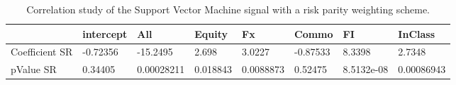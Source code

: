 \begin{table}[H]
\centering
\begin{tabular}{llllllll}
& intercept & All & Equity & Fx & Commo & FI & InClass \\ 
\hline 
Coefficient SR & -0.72356 & -15.2495 & 2.698 & 3.0227 & -0.87533 & 8.3398 & 2.7348 \\ 
pValue SR & 0.34405 & 0.00028211 & 0.018843 & 0.0088873 & 0.52475 & 8.5132e-08 & 0.00086943 \\ 
\hline
\end{tabular}
\caption{Correlation study of the Support Vector Machine signal with a risk parity weighting scheme.}
\label{SVM_RP_CORR}
\end{table}